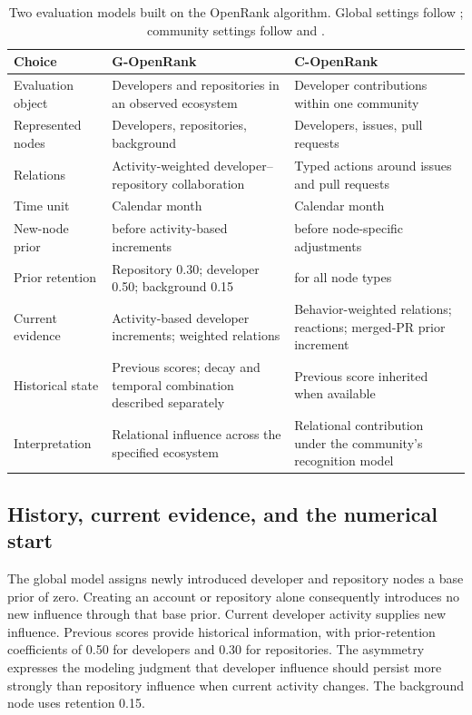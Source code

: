 \begin{table}[tbp]
\caption{Two evaluation models built on the OpenRank algorithm. Global settings follow \citet[Section 3.2]{han2026rank}; community settings follow \citet[Section 3.3]{zhao2024} and \citet[Section 6.2]{zhao2025thesis}.}
\label{tab:ch5-models}
\centering\small
\renewcommand{\arraystretch}{1.16}
\begin{tabularx}{\linewidth}{@{}>{\raggedright\arraybackslash}p{24mm}>{\raggedright\arraybackslash}X>{\raggedright\arraybackslash}X@{}}
\toprule
Choice&G-OpenRank&C-OpenRank\\
\midrule
Evaluation object&Developers and repositories in an observed ecosystem&Developer contributions within one community\\
Represented nodes&Developers, repositories, background&Developers, issues, pull requests\\
Relations&Activity-weighted developer--repository collaboration&Typed actions around issues and pull requests\\
Time unit&Calendar month&Calendar month\\
New-node prior&0 before activity-based increments&1 before node-specific adjustments\\
Prior retention&Repository 0.30; developer 0.50; background 0.15&0.15 for all node types\\
Current evidence&Activity-based developer increments; weighted relations&Behavior-weighted relations; reactions; merged-PR prior increment\\
Historical state&Previous scores; decay and temporal combination described separately&Previous score inherited when available\\
Interpretation&Relational influence across the specified ecosystem&Relational contribution under the community's recognition model\\
\bottomrule
\end{tabularx}
\end{table}

\subsection{History, current evidence, and the numerical start}
The global model assigns newly introduced developer and repository nodes a base prior of zero. Creating an account or repository alone consequently introduces no new influence through that base prior. Current developer activity supplies new influence. Previous scores provide historical information, with prior-retention coefficients of 0.50 for developers and 0.30 for repositories. The asymmetry expresses the modeling judgment that developer influence should persist more strongly than repository influence when current activity changes. The background node uses retention 0.15.

